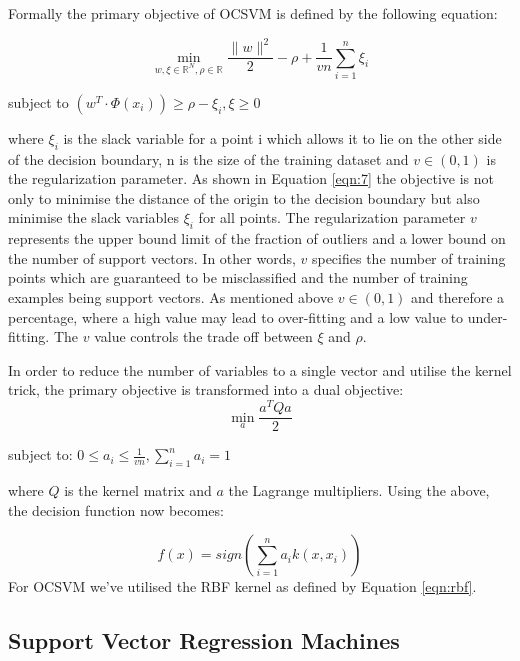 \documentclass{mpaper}
\begin{document}
Formally the primary objective of OCSVM is defined by the following equation:

\begin{equation}\label{eqn:7}
    \min_{w, \xi \in \mathbb{R}^N, \rho\in\mathbb{R}} \frac{\parallel{w}\parallel^2}{2} - \rho + \frac{1}{vn}\sum_{i=1}^n \xi_i 
\end{equation}
\begin{center}
subject to $(w^T \cdot \Phi(x_i)) \geq \rho - \xi_i, \xi \geq 0$
\end{center}
where $\xi_i$ is the slack variable for a point i which allows it to lie on the other side of the decision boundary, n is the size of the training dataset and $v \in (0,1)$ is the regularization parameter. As shown in Equation \ref{eqn:7} the objective is not only to minimise the distance of the origin to the decision boundary but also minimise the slack variables $\xi_i$ for all points. The regularization parameter $v$ represents the upper bound limit of the fraction of outliers and a lower bound on the number of support vectors. In other words, $v$ specifies the number of training points which are guaranteed to be misclassified and the number of training examples being support vectors. As mentioned above $v \in (0,1)$ and therefore a percentage, where a high value may lead to over-fitting and a low value to under-fitting. The $v$ value controls the trade off between $\xi$ and $\rho$.

In order to reduce the number of variables to a single vector and utilise the kernel trick, the primary objective is transformed into a dual objective:
\begin{equation}
    \min_a \frac{a^TQa}{2}
\end{equation}
\begin{center}
    subject to: $0 \leq a_i \leq \frac{1}{vn}, \sum_{i=1}^n a_i = 1$
\end{center}
where $Q$ is the kernel matrix and $a$ the Lagrange multipliers. Using the above, the decision function now becomes:

\begin{equation}
    f(x) = sign(\sum_{i=1}^n a_i k(x, x_i))
\end{equation}
For OCSVM we've utilised the RBF kernel as defined by Equation \ref{eqn:rbf}.

\subsection{Support Vector Regression Machines}
\end{document}
